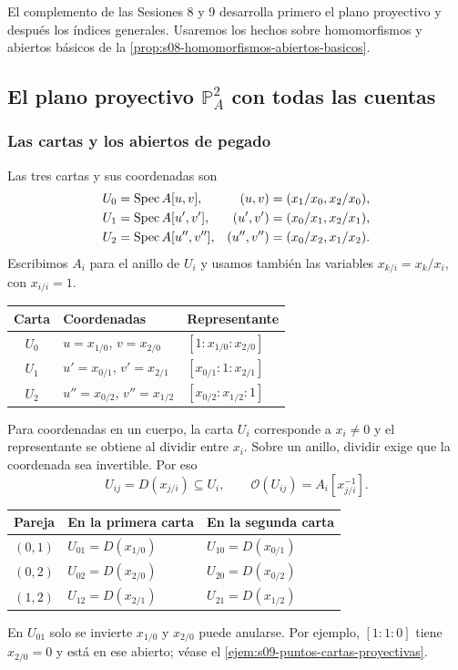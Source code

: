 El complemento de las Sesiones 8 y 9 desarrolla primero el plano proyectivo y después los índices generales. Usaremos los hechos sobre homomorfismos y abiertos básicos de la \cref{prop:s08-homomorfismos-abiertos-basicos}.

\subsection{El plano proyectivo \texorpdfstring{$\mathbb P^2_A$}{P2A} con todas las cuentas}
\label{sec:s09-plano-cuentas}

\subsubsection{Las cartas y los abiertos de pegado}

\begin{ejem}[$\mathbb P^2_A$]
\label{ejem:s09-pegados-plano-proyectivo}
Las tres cartas y sus coordenadas son
\[
\begin{aligned}
U_0&=\operatorname{Spec} A[u,v], &(u,v)&=(x_1/x_0,x_2/x_0),\\
U_1&=\operatorname{Spec} A[u',v'], &(u',v')&=(x_0/x_1,x_2/x_1),\\
U_2&=\operatorname{Spec} A[u'',v''], &(u'',v'')&=(x_0/x_2,x_1/x_2).
\end{aligned}
\]
Escribimos $A_i$ para el anillo de $U_i$ y usamos también las variables $x_{k/i}=x_k/x_i$, con $x_{i/i}=1$.
\begin{center}
\begin{tabular}{cll}
\hline
Carta & Coordenadas & Representante\\
\hline
$U_0$ & $u=x_{1/0}$, $v=x_{2/0}$ & $[1:x_{1/0}:x_{2/0}]$\\
$U_1$ & $u'=x_{0/1}$, $v'=x_{2/1}$ & $[x_{0/1}:1:x_{2/1}]$\\
$U_2$ & $u''=x_{0/2}$, $v''=x_{1/2}$ & $[x_{0/2}:x_{1/2}:1]$\\
\hline
\end{tabular}
\end{center}
Para coordenadas en un cuerpo, la carta $U_i$ corresponde a $x_i\ne0$ y el representante se obtiene al dividir entre $x_i$. Sobre un anillo, dividir exige que la coordenada sea invertible. Por eso
\[
U_{ij}=D(x_{j/i})\subseteq U_i,\qquad
\mathcal O(U_{ij})=A_i[x_{j/i}^{-1}].
\]
\begin{center}
\begin{tabular}{cll}
\hline
Pareja & En la primera carta & En la segunda carta\\
\hline
$(0,1)$ & $U_{01}=D(x_{1/0})$ & $U_{10}=D(x_{0/1})$\\
$(0,2)$ & $U_{02}=D(x_{2/0})$ & $U_{20}=D(x_{0/2})$\\
$(1,2)$ & $U_{12}=D(x_{2/1})$ & $U_{21}=D(x_{1/2})$\\
\hline
\end{tabular}
\end{center}
En $U_{01}$ solo se invierte $x_{1/0}$ y $x_{2/0}$ puede anularse. Por ejemplo, $[1:1:0]$ tiene $x_{2/0}=0$ y está en ese abierto; véase el \cref{ejem:s09-puntos-cartas-proyectivas}.
\end{ejem}

